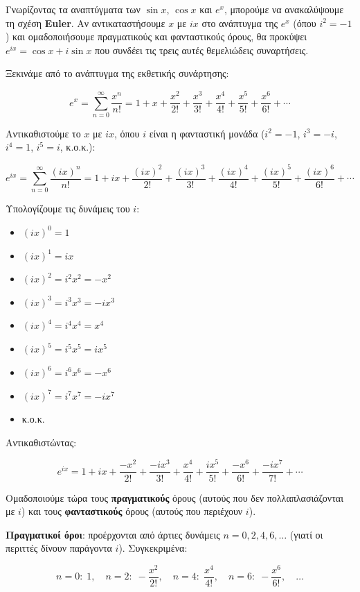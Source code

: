 \documentclass[
  a4paper,
  11pt,
]{article}
\providecommand{\tightlist}{%
  \setlength{\itemsep}{0pt}\setlength{\parskip}{0pt}}
\begin{document}
Γνωρίζοντας τα αναπτύγματα των \(\sin x\), \(\cos x\) και \(e^x\),
μπορούμε να ανακαλύψουμε τη σχέση \textbf{Euler}. Αν αντικαταστήσουμε
\(x\) με \(ix\) στο ανάπτυγμα της \(e^x\) (όπου \(i^2=-1\)) και
ομαδοποιήσουμε πραγματικούς και φανταστικούς όρους, θα προκύψει
\(e^{ix} = \cos x + i\sin x\) που συνδέει τις τρεις αυτές θεμελιώδεις
συναρτήσεις.

Ξεκινάμε από το ανάπτυγμα της εκθετικής συνάρτησης:

\[
e^{x} = \sum_{n=0}^{\infty} \frac{x^n}{n!} = 1 + x + \frac{x^2}{2!} + \frac{x^3}{3!} + \frac{x^4}{4!} + \frac{x^5}{5!} + \frac{x^6}{6!} + \cdots
\]

Αντικαθιστούμε το \(x\) με \(ix\), όπου \(i\) είναι η φανταστική μονάδα
(\(i^2 = -1\), \(i^3 = -i\), \(i^4 = 1\), \(i^5 = i\), κ.ο.κ.):

\[
e^{ix} = \sum_{n=0}^{\infty} \frac{(ix)^n}{n!} = 1 + ix + \frac{(ix)^2}{2!} + \frac{(ix)^3}{3!} + \frac{(ix)^4}{4!} + \frac{(ix)^5}{5!} + \frac{(ix)^6}{6!} + \cdots
\]

Υπολογίζουμε τις δυνάμεις του \(i\):

\begin{itemize}
\tightlist
\item
  \((ix)^0 = 1\)
\item
  \((ix)^1 = i x\)
\item
  \((ix)^2 = i^2 x^2 = -x^2\)
\item
  \((ix)^3 = i^3 x^3 = -i x^3\)
\item
  \((ix)^4 = i^4 x^4 = x^4\)
\item
  \((ix)^5 = i^5 x^5 = i x^5\)
\item
  \((ix)^6 = i^6 x^6 = -x^6\)
\item
  \((ix)^7 = i^7 x^7 = -i x^7\)
\item
  κ.ο.κ.
\end{itemize}

Αντικαθιστώντας:

\[
e^{ix} = 1 + ix + \frac{-x^2}{2!} + \frac{-i x^3}{3!} + \frac{x^4}{4!} + \frac{i x^5}{5!} + \frac{-x^6}{6!} + \frac{-i x^7}{7!} + \cdots
\]

Ομαδοποιούμε τώρα τους \textbf{πραγματικούς} όρους (αυτούς που δεν
πολλαπλασιάζονται με \(i\)) και τους \textbf{φανταστικούς} όρους (αυτούς
που περιέχουν \(i\)).

\textbf{Πραγματικοί όροι}: προέρχονται από άρτιες δυνάμεις
\(n = 0,2,4,6,\dots\) (γιατί οι περιττές δίνουν παράγοντα \(i\)).
Συγκεκριμένα:

\[
n=0:\; 1,\quad n=2:\; -\frac{x^2}{2!},\quad n=4:\; \frac{x^4}{4!},\quad n=6:\; -\frac{x^6}{6!},\quad \dots
\]
\end{document}
